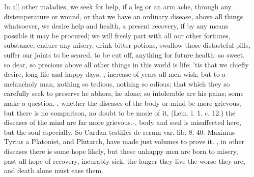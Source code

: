 In all other maladies, we seek for help, if a leg or an arm ache,
through any distemperature or wound, or that we have an ordinary
disease, above all things whatsoever, we desire help and health, a
present recovery, if by any means possible it may be procured; we will
freely part with all our other fortunes, substance, endure any misery,
drink bitter potions, swallow those distasteful pills, suffer our
joints to be seared, to be cut off, anything for future health: so
sweet, so dear, so precious above all other things in this world is
life: 'tis that we chiefly desire, long life and happy days,
, increase of years all men wish; but to a
melancholy man, nothing so tedious, nothing so odious; that which they
so carefully seek to preserve he abhors, he alone; so intolerable
are his pains; some make a question, ,
whether the diseases of the body or mind be more grievous, but there is
no comparison, no doubt to be made of it,  (Lem. l. 1. c. 12.) the
diseases of the mind are far more grievous.-, body and soul is misaffected here, but the soul especially. So
Cardan testifies de rerum var. lib. 8. 40. Maximus Tyrius a
Platonist, and Plutarch, have made just volumes to prove it. , in other diseases there is some hope
likely, but these unhappy men are born to misery, past all hope of
recovery, incurably sick, the longer they live the worse they are, and
death alone must ease them.


